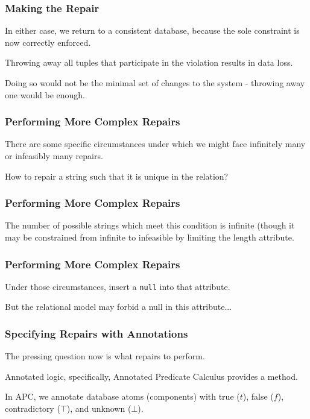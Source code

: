 \begin{frame}
\frametitle{Making the Repair}

In either case, we return to a consistent database, because the sole constraint is now correctly enforced.

Throwing away all tuples that participate in the violation results in data loss.

Doing so would not be the minimal set of changes to the system - throwing away one would be enough.

\end{frame}


\begin{frame}
\frametitle{Performing More Complex Repairs}

There are some specific circumstances under which we might face infinitely many or infeasibly many repairs. 

How to repair a string such that it is unique in the relation? 


\end{frame}


\begin{frame}
\frametitle{Performing More Complex Repairs}

The number of possible strings which meet this condition is infinite (though it may be constrained from infinite to infeasible by limiting the length attribute. 


\end{frame}


\begin{frame}
\frametitle{Performing More Complex Repairs}

Under those circumstances, insert a \texttt{null} into that attribute.

But the relational model may forbid a null in this attribute...


\end{frame}


\begin{frame}
\frametitle{Specifying Repairs with Annotations}

The pressing question now is what repairs to perform. 

Annotated logic, specifically, \alert{Annotated Predicate Calculus} provides a method.

In APC, we annotate database atoms (components) with true ($t$), false ($f$), contradictory ($\top$), and unknown ($\bot$).


\end{frame}

